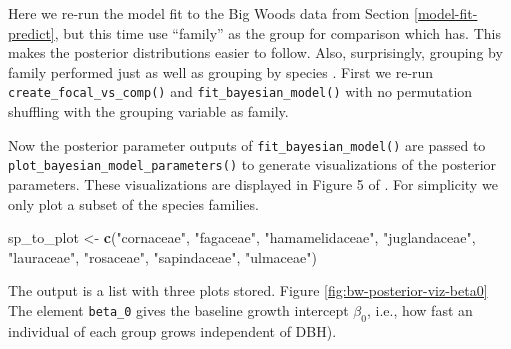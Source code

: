 \documentclass[12pt]{article}
\newenvironment{Shaded}{\begin{snugshade}}{\end{snugshade}}
\newcommand{\DataTypeTok}[1]{\textcolor[rgb]{0.13,0.29,0.53}{#1}}
\newcommand{\KeywordTok}[1]{\textcolor[rgb]{0.13,0.29,0.53}{\textbf{#1}}}
\newcommand{\NormalTok}[1]{#1}
\newcommand{\OperatorTok}[1]{\textcolor[rgb]{0.81,0.36,0.00}{\textbf{#1}}}
\newcommand{\OtherTok}[1]{\textcolor[rgb]{0.56,0.35,0.01}{#1}}
\newcommand{\StringTok}[1]{\textcolor[rgb]{0.31,0.60,0.02}{#1}}
\begin{document}
Here we re-run the model fit to the Big Woods data from Section
\ref{model-fit-predict}, but this time use ``family'' as the group for
comparison which has. This makes the posterior distributions easier to
follow. Also, surprisingly, grouping by family performed just as well as
grouping by species \citet{allen_permutation_2020}. First we re-run
\texttt{create\_focal\_vs\_comp()} and \texttt{fit\_bayesian\_model()}
with no permutation shuffling with the grouping variable as family.

\begin{Shaded}
\end{Shaded}

Now the posterior parameter outputs of \texttt{fit\_bayesian\_model()}
are passed to \texttt{plot\_bayesian\_model\_parameters()} to generate
visualizations of the posterior parameters. These visualizations are
displayed in Figure 5 of \citet{allen_permutation_2020}. For simplicity
we only plot a subset of the species families.

\begin{Shaded}
\begin{Highlighting}[]
\NormalTok{sp_to_plot <-}\StringTok{ }\KeywordTok{c}\NormalTok{(}\StringTok{"cornaceae"}\NormalTok{, }\StringTok{"fagaceae"}\NormalTok{, }\StringTok{"hamamelidaceae"}\NormalTok{, }\StringTok{"juglandaceae"}\NormalTok{, }
                 \StringTok{"lauraceae"}\NormalTok{, }\StringTok{"rosaceae"}\NormalTok{, }\StringTok{"sapindaceae"}\NormalTok{, }\StringTok{"ulmaceae"}\NormalTok{)}
\end{Highlighting}
\end{Shaded}

The output is a list with three plots stored. Figure
\ref{fig:bw-posterior-viz-beta0} The element \texttt{beta\_0} gives the
baseline growth intercept \(\beta_0\), i.e., how fast an individual of
each group grows independent of DBH).
\end{document}

